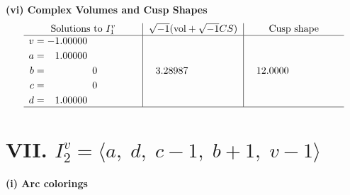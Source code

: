 \documentclass[1p]{elsarticle_modified}
\theoremstyle{definition}
\newcommand{\I}{\sqrt{-1}}
\begin{document}
\newpage\flushleft \textbf{(vi) Complex Volumes and Cusp Shapes}
$$\begin{array}{c|c|c}  
\text{Solutions to }I^v_{1}& \I (\text{vol} + \sqrt{-1}CS) & \text{Cusp shape}\\
 \hline 
\begin{aligned}
v &= -1.00000\phantom{ +0.000000I} \\
a &= \phantom{-}1.00000\phantom{ +0.000000I} \\
b &= \phantom{-0.000000 } 0 \\
c &= \phantom{-0.000000 } 0 \\
d &= \phantom{-}1.00000\phantom{ +0.000000I}\end{aligned}
 & \phantom{-}3.28987\phantom{ +0.000000I} & \phantom{-}12.0000\phantom{ +0.000000I}\\
 \hline 
 \end{array}$$\newpage\newpage\renewcommand{\arraystretch}{1}
\centering \section*{VII. $I^v_{2}= \langle a,\;d,\;c-1,\;b+1,\;v-1 \rangle$}
\flushleft \textbf{(i) Arc colorings}\\
\end{document}
